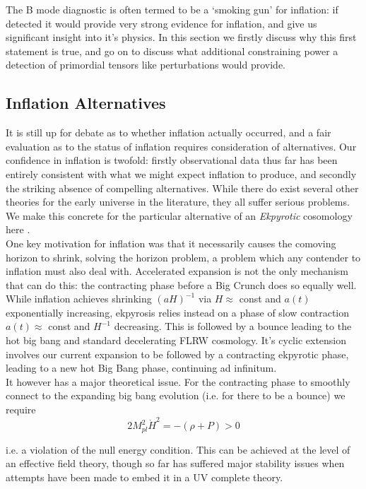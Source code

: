\documentclass[a4paper,10pt]{article}
\newcommand{\Mp}{M_{pl}}
\begin{document}
The B mode diagnostic is often termed to be a `smoking gun' for inflation: if detected it would provide very strong evidence for inflation, and give us significant insight into it's physics. In this section we firstly discuss why this first statement is true, and go on to discuss what additional constraining power a detection of primordial tensors like perturbations would provide.

\subsection{Inflation Alternatives}

It is still up for debate as to whether inflation actually occurred, and a fair evaluation as to the status of inflation requires consideration of alternatives. Our confidence in inflation is twofold: firstly observational data thus far has been entirely consistent with what we might expect inflation to produce, and secondly the striking absence of compelling alternatives. While there do exist several other theories for the early universe in the literature, they all suffer serious problems. We make this concrete for the particular alternative of an \textit{Ekpyrotic} cosomology here \cite{CMBPol}.\\

One key motivation for inflation was that it necessarily causes the comoving horizon to shrink, solving the horizon problem, a problem which any contender to inflation must also deal with. Accelerated expansion is not the only mechanism that can do this: the contracting phase before a Big Crunch does so equally well. While inflation achieves shrinking $(aH)^{-1}$ via $H\approx$ const and $a(t)$ exponentially increasing, ekpyrosis relies instead on a phase of slow contraction $a(t)\approx$ const and $H^{-1}$ decreasing. This is followed by a bounce leading to the hot big bang and standard decelerating FLRW cosmology. It's cyclic extension involves our current expansion to be followed by a contracting ekpyrotic phase, leading to a new hot Big Bang phase, continuing ad infinitum.\\

It however has a major theoretical issue. For the contracting phase to smoothly connect to the expanding big bang evolution (i.e. for there to be a bounce) we require
\begin{equation}
2\Mp^2\dot{H}^2 = -(\rho + P) > 0
\end{equation} 

i.e. a violation of the null energy condition. This can be achieved at the level of an effective field theory, though so far has suffered major stability issues when attempts have been made to embed it in a UV complete theory.\\
\end{document}
